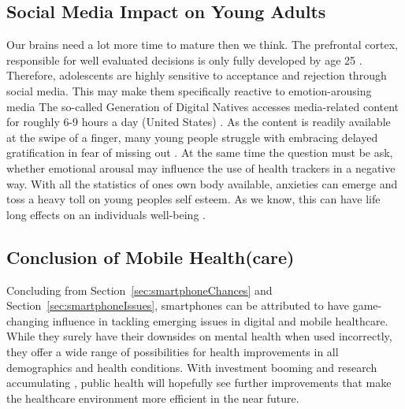 \subsection{Social Media Impact on Young Adults}
Our brains need a lot more time to mature then we think. The prefrontal cortex, responsible for well evaluated decisions is only fully developed by age 25 \cite{prefrontalCortexDev}. Therefore, adolescents are highly sensitive to acceptance and rejection through social media. This may make them specifically reactive to emotion-arousing media The so-called Generation of Digital Natives accesses media-related content for roughly 6-9 hours a day (United States) \cite{crone2018media}. As the content is readily available at the swipe of a finger, many young people struggle with embracing delayed gratification in fear of missing out \cite{oberst2017negative}. At the same time the question must be ask, whether emotional arousal may influence the use of health trackers in a negative way. With all the statistics of ones own body available, anxieties can emerge and toss a heavy toll on young peoples self esteem. As we know, this can have life long effects on an individuals well-being \cite{mykletun2006mortality}.
\subsection{Conclusion of Mobile Health(care)}
Concluding from Section~\ref{sec:smartphoneChances} and Section~\ref{sec:smartphoneIssues}, smartphones can be attributed to have game-changing influence in tackling emerging issues in digital and mobile healthcare. While they surely have their downsides on mental health when used incorrectly, they offer a wide range of possibilities for health improvements in all demographics and health conditions. With investment booming \cite{safavi2019top} and research accumulating \cite{firth2016ecological}, public health will hopefully see further improvements that make the healthcare environment more efficient in the near future.
